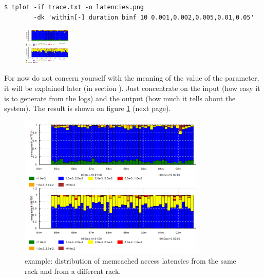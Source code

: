 \documentclass{article}
\begin{document}
\begin{verbatim}
$ tplot -if trace.txt -o latencies.png
        -dk 'within[-] duration binf 10 0.001,0.002,0.005,0.01,0.05'
\end{verbatim}

\begin{figure}
\vspace{-25pt}
\center
\includegraphics[height=50pt]{pics/tplot/tplot-motivating-example.png}
\end{figure}

For now do not concern yourself with the meaning of the value of the  parameter, it will be explained later (in section ). Just concentrate on the input (how easy it is to generate from the logs) and the output (how much it tells about the system). The result is shown on figure \ref{fig:tplot-motivating-example} (next page).

\pagebreak

\begin{figure}[h]
\center
\includegraphics[width=0.8\textwidth]{pics/tplot/tplot-motivating-example.png}
\caption{\timeplot{} example: distribution of memcached access latencies from the same rack and from a different rack.}
\label{fig:tplot-motivating-example}
\end{figure}
\end{document}
